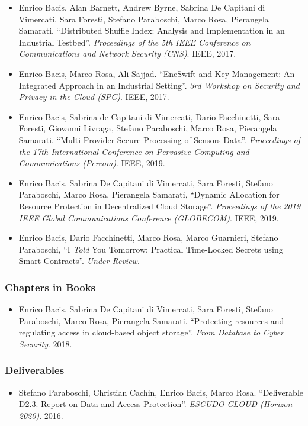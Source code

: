\documentclass[a4paper]{article}
\begin{document}
\begin{sloppy}
\begin{itemize}
		\item Enrico Bacis, Alan Barnett, Andrew Byrne, Sabrina De Capitani di Vimercati, Sara Foresti, Stefano Paraboschi, Marco Rosa, Pierangela Samarati. ``Distributed Shuffle Index: Analysis and Implementation in an Industrial Testbed''. {\em Proceedings of the 5th IEEE Conference on Communications and Network Security (CNS)}. IEEE, 2017.
		
		\item Enrico Bacis, Marco Rosa, Ali Sajjad. ``EncSwift and Key Management: An Integrated Approach in an Industrial Setting''. {\em 3rd Workshop on Security and Privacy in the Cloud (SPC)}. IEEE, 2017.
		
		\item  Enrico Bacis, Sabrina de Capitani di Vimercati, Dario Facchinetti, Sara Foresti, Giovanni Livraga, Stefano Paraboschi, Marco Rosa, Pierangela Samarati. ``Multi-Provider Secure Processing of Sensors Data''. {\em Proceedings of the 17th International Conference on Pervasive Computing and Communications (Percom)}. IEEE, 2019.
		
		\item Enrico Bacis, Sabrina De Capitani di Vimercati, Sara Foresti, Stefano Paraboschi, Marco Rosa, Pierangela Samarati, ``Dynamic Allocation for Resource Protection in Decentralized Cloud Storage''. {\em Proceedings of the 2019 IEEE Global Communications Conference (GLOBECOM)}. IEEE, 2019.
		
		\item Enrico Bacis, Dario Facchinetti, Marco Rosa, Marco Guarnieri, Stefano Paraboschi, ``I {\em Told} You Tomorrow: Practical Time-Locked Secrets using Smart Contracts''. {\em Under Review}.
	\end{itemize}
	
	\subsubsection*{Chapters in Books}
	\begin{itemize}
		\item  Enrico Bacis,	Sabrina De Capitani di Vimercati, Sara Foresti,	Stefano Paraboschi,	Marco Rosa,	Pierangela Samarati. ``Protecting resources and regulating access in cloud-based object storage''. {\em From Database to Cyber Security}. 2018.
	\end{itemize}
	
	\subsubsection*{Deliverables}
	\begin{itemize}
		\item Stefano Paraboschi, Christian Cachin, Enrico Bacis, Marco Rosa. ``Deliverable D2.3. Report on Data and Access Protection''. {\em ESCUDO-CLOUD (Horizon 2020)}. 2016.


\end{itemize}
\end{sloppy}
\end{document}
